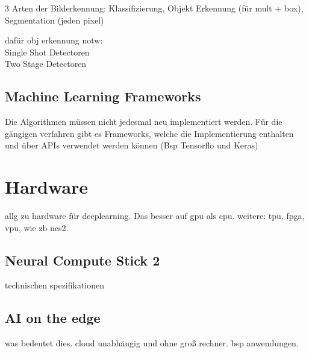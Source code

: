 3 Arten der Bilderkennung: Klassifizierung, Objekt Erkennung (für mult + box), Segmentation (jeden pixel)

dafür obj erkennung notw:\\

Single Shot Detectoren
\\

Two Stage Detectoren


\subsection{Machine Learning Frameworks}

Die Algorithmen müssen nicht jedesmal neu implementiert werden. 
Für die gängigen verfahren gibt es Frameworks, welche 
die Implementierung enthalten und über APIs verwendet 
werden können (Bsp Tensorflo und Keras)



\section{Hardware}\label{sec:hardware}


allg zu hardware für deeplearning. Das besser auf gpu als cpu. weitere: tpu, fpga, vpu, wie zb ncs2.

\subsection{Neural Compute Stick 2}

technischen spezifikationen





\subsection{AI on the edge}

was bedeutet dies. cloud unabhängig und ohne groß rechner. bsp anwendungen.

